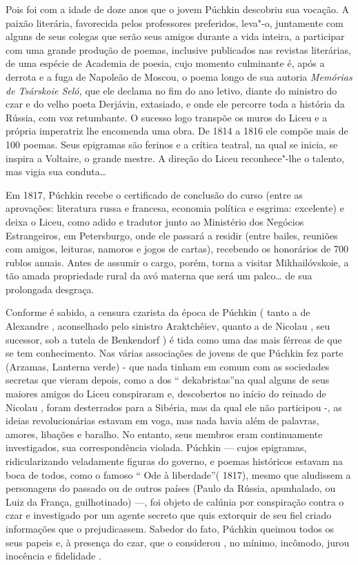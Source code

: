 Pois foi com a idade de doze anos que o jovem Púchkin descobriu sua
vocação. A paixão literária, favorecida pelos professores preferidos,
leva"-o, juntamente com alguns de seus colegas que serão seus amigos
durante a vida inteira, a participar com uma grande produção de poemas,
inclusive publicados nas revistas literárias, de uma espécie de Academia
de poesia, cujo momento culminante é, após a derrota e a fuga de
Napoleão de Moscou, o poema longo de sua autoria \emph{Memórias de
Tsárskoie Seló,} que ele declama no fim do ano letivo, diante do
ministro do czar e do velho poeta Derjávin, extasiado, e onde ele
percorre toda a história da Rússia, com voz retumbante. O sucesso logo
transpõe os muros do Liceu e a própria imperatriz lhe encomenda uma
obra. De 1814 a 1816 ele compõe mais de 100 poemas. Seus epigramas são
ferinos e a crítica teatral, na qual se inicia, se inspira a Voltaire, o
grande mestre. A direção do Liceu reconhece"-lhe o talento, mas vigia sua
conduta\ldots{}

Em 1817, Púchkin recebe o certificado de conclusão do curso (entre as
aprovações: literatura russa e francesa, economia política e esgrima:
excelente) e deixa o Liceu, como adido e tradutor junto ao Ministério
dos Negócios Estrangeiros, em Petersburgo, onde ele passará a residir
(entre bailes, reuniões com amigos, leituras, namoros e jogos de
cartas), recebendo os honorários de 700 rublos anuais. Antes de assumir
o cargo, porém, torna a visitar Mikhailóvskoie, a tão amada propriedade
rural da avó materna que será um palco\ldots{} de sua prolongada desgraça.

Conforme é sabido, a censura czarista da época de Púchkin ( tanto a de
Alexandre , aconselhado pelo sinistro Araktchêiev, quanto a de Nicolau
, seu sucessor, sob a tutela de Benkendorf ) é tida como uma das mais
férreas de que se tem conhecimento. Nas várias associações de jovens de
que Púchkin fez parte (Arzamas, Lanterna verde) - que nada tinham em
comum com as sociedades secretas que vieram depois, como a dos ``
dekabristas''na qual alguns de seus maiores amigos do Liceu conspiraram
e, descobertos no início do reinado de Nicolau , foram desterrados para
a Sibéria, mas da qual ele não participou -, as ideias revolucionárias
estavam em voga, mas nada havia além de palavras, amores, libações e
baralho. No entanto, seus membros eram continuamente investigados, sua
correspondência violada. Púchkin --- cujos epigramas, ridicularizando
veladamente figuras do governo, e poemas históricos estavam na boca de
todos, como o famoso `` Ode à liberdade''( 1817), mesmo que aludissem a
personagens do passado ou de outros países (Paulo  da Rússia,
apunhalado, ou Luiz  da França, guilhotinado) ---, foi objeto de
calúnia por conspiração contra o czar e investigado por um agente
secreto que quis extorquir de seu fiel criado informações que o
prejudicassem. Sabedor do fato, Púchkin queimou todos os seus papeis e,
à presença do czar, que o considerou , no mínimo, incômodo, jurou
inocência e fidelidade .

